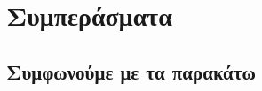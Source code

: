 \documentclass[a4paper,12pt,twoside]{report}
\begin{document}
	\chapter{Συμπεράσματα}
		\label{κεφ.:Συμπεράσματα}

		\section{Συμφωνούμε με τα παρακάτω}
\end{document}
